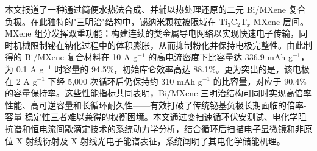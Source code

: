 本文报道了一种通过简便水热法合成、并辅以热处理还原的二元 Bi/MXene 复合负极。在此独特的"三明治"结构中，铋纳米颗粒被限域在 Ti$_{3}$C$_{2}$T$_{x}$ MXene 层间。MXene 组分发挥双重功能：构建连续的类金属导电网络以实现快速电子传输，同时机械限制铋在钠化过程中的体积膨胀，从而抑制粉化并保持电极完整性。由此制得的 Bi/MXene 复合材料在 10 A g$^{-1}$ 的高电流密度下比容量达 336.9 mAh g$^{-1}$，为 0.1 A g$^{-1}$ 时容量的 94.5\%，初始库仑效率高达 88.1\%。更为突出的是，该电极在 2 A g$^{-1}$ 下经 5,000 次循环后仍保持约 310 mAh g$^{-1}$ 的比容量，对应于 90.4\% 的容量保持率。这些性能指标共同表明，Bi/MXene 三明治结构可同时实现高倍率性能、高可逆容量和长循环耐久性——有效打破了传统铋基负极长期面临的倍率-容量-稳定性三者难以兼得的权衡困境。本文通过变扫速循环伏安测试、电化学阻抗谱和恒电流间歇滴定技术的系统动力学分析，结合循环后扫描电子显微镜和非原位 X 射线衍射及 X 射线光电子能谱表征，系统阐明了其电化学储能机理。
